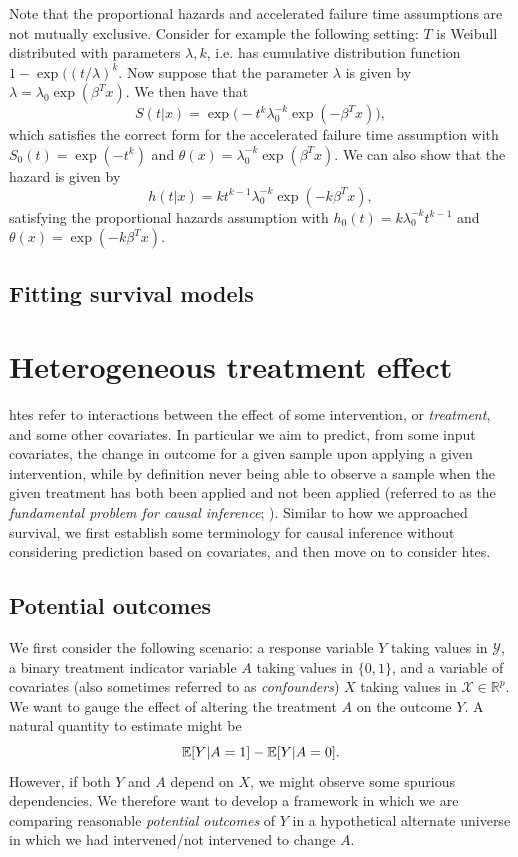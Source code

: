 \documentclass[../thesis.tex]{subfiles}
\begin{document}
Note that the proportional hazards and accelerated failure time assumptions are not mutually exclusive. Consider for example the following setting: $T$ is Weibull distributed with parameters $\lambda, k$, i.e. has cumulative distribution function $1- \exp((t/\lambda)^k$. Now suppose that the parameter $\lambda$ is given by $\lambda = \lambda_0 \exp(\beta^T x)$. We then have that 
\[S(t|x) = \exp\big(-t^k\lambda_0^{-k}\exp( -\beta^Tx)\big), \]
which satisfies the correct form for the accelerated failure time assumption with $S_0(t) = \exp(-t^k)$ and $\theta(x) = \lambda_0^{-k}\exp(\beta^Tx)$. We can also show that the hazard is given by 
\[h(t|x) = kt^{k-1}\lambda_0^{-k} \exp(-k\beta^Tx), \]
satisfying the proportional hazards assumption with $h_0(t) = k\lambda_0^{-k}t^{k-1}$ and $\theta(x) = \exp(-k\beta^Tx)$. 

\subsection{Fitting survival models}

\section{Heterogeneous treatment effect}
\Glspl{hte} refer to interactions between the effect of some intervention, or \emph{treatment}, and some other covariates. In particular we aim to predict, from some input covariates, the change in outcome for a given sample upon applying a given intervention, while by definition never being able to observe a sample when the given treatment has both been applied and not been applied (referred to as the \emph{fundamental problem for causal inference}; \citealp{holland_statistics_1986}). Similar to how we approached survival, we first establish some terminology for causal inference without considering prediction based on covariates, and then move on to consider \glspl{hte}.

\subsection{Potential outcomes}
We first consider the following scenario: a response variable $Y$ taking values in $\mathcal{Y}$, a binary treatment indicator variable $A$ taking values in $\{0,1\}$, and a variable of covariates (also sometimes referred to as \emph{confounders}) $X$ taking values in $\mathcal{X} \in \mathbb{R}^p$. We want to gauge the effect of altering the treatment $A$ on the outcome $Y$. A natural quantity to estimate might be
\[\mathbb{E}[Y | A = 1] - \mathbb{E}[Y | A = 0].\]
However, if both $Y$ and $A$ depend on $X$, we might observe some spurious dependencies. We therefore want to develop a framework in which we are comparing reasonable \emph{potential outcomes} of $Y$ in a hypothetical alternate universe in which we had intervened/not intervened to change $A$.
\end{document}
